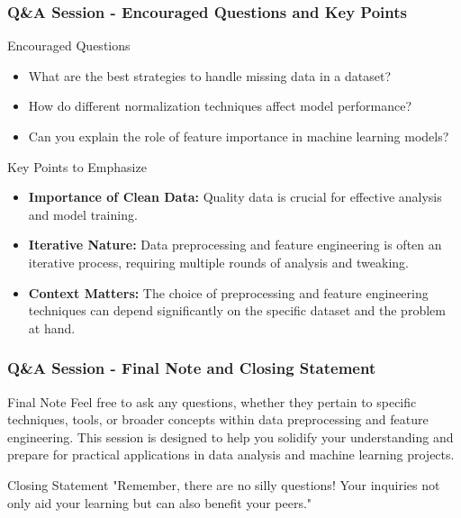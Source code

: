 \documentclass[aspectratio=169]{beamer}
\begin{document}
\begin{frame}[fragile]
    \frametitle{Q\&A Session - Encouraged Questions and Key Points}
    \begin{block}{Encouraged Questions}
        \begin{itemize}
            \item What are the best strategies to handle missing data in a dataset?
            \item How do different normalization techniques affect model performance?
            \item Can you explain the role of feature importance in machine learning models?
        \end{itemize}
    \end{block}
    
    \begin{block}{Key Points to Emphasize}
        \begin{itemize}
            \item \textbf{Importance of Clean Data:} Quality data is crucial for effective analysis and model training.
            \item \textbf{Iterative Nature:} Data preprocessing and feature engineering is often an iterative process, requiring multiple rounds of analysis and tweaking.
            \item \textbf{Context Matters:} The choice of preprocessing and feature engineering techniques can depend significantly on the specific dataset and the problem at hand.
        \end{itemize}
    \end{block}
\end{frame}

\begin{frame}[fragile]
    \frametitle{Q\&A Session - Final Note and Closing Statement}
    \begin{block}{Final Note}
        Feel free to ask any questions, whether they pertain to specific techniques, tools, or broader concepts within data preprocessing and feature engineering. This session is designed to help you solidify your understanding and prepare for practical applications in data analysis and machine learning projects.
    \end{block}
    
    \begin{block}{Closing Statement}
        "Remember, there are no silly questions! Your inquiries not only aid your learning but can also benefit your peers."
    \end{block}
\end{frame}
\end{document}
